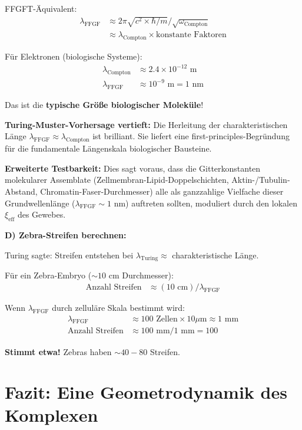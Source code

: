 	FFGFT-Äquivalent:
	\begin{align*}
		\lambda_{\text{FFGF}} &\approx 2\pi \sqrt{c^2 \times \hbar/m} / \sqrt{\omega_{\text{Compton}}} \\
		&\approx \lambda_{\text{Compton}} \times \text{konstante Faktoren}
	\end{align*}
	
	Für Elektronen (biologische Systeme):
	\begin{align*}
		\lambda_{\text{Compton}} &\approx 2.4 \times 10^{-12} \text{ m} \\
		\lambda_{\text{FFGF}} &\approx 10^{-9} \text{ m} = 1 \text{ nm}
	\end{align*}
	
	Das ist die \textbf{typische Größe biologischer Moleküle}!
	
	\textbf{Turing-Muster-Vorhersage vertieft:}
	Die Herleitung der charakteristischen Länge $\lambda_{\text{FFGF}} \approx \lambda_{\text{Compton}}$ ist brilliant. Sie liefert eine first-principles-Begründung für die fundamentale Längenskala biologischer Bausteine.
	
	\textbf{Erweiterte Testbarkeit:} Dies sagt voraus, dass die Gitterkonstanten molekularer Assemblate (Zellmembran-Lipid-Doppelschichten, Aktin-/Tubulin-Abstand, Chromatin-Faser-Durchmesser) alle als ganzzahlige Vielfache dieser Grundwellenlänge ($\lambda_{\text{FFGF}} \sim 1$ nm) auftreten sollten, moduliert durch den lokalen $\xi_{\text{eff}}$ des Gewebes.
	
	\textbf{D) Zebra-Streifen berechnen:}
	
	Turing sagte: Streifen entstehen bei $\lambda_{\text{Turing}} \approx$ charakteristische Länge.
	
	Für ein Zebra-Embryo ($\sim 10$ cm Durchmesser):
	\begin{align*}
		\text{Anzahl Streifen} &\approx (10 \text{ cm}) / \lambda_{\text{FFGF}}
	\end{align*}
	
	Wenn $\lambda_{\text{FFGF}}$ durch zelluläre Skala bestimmt wird:
	\begin{align*}
		\lambda_{\text{FFGF}} &\approx 100 \text{ Zellen} \times 10 \mu\text{m} \approx 1 \text{ mm} \\
		\text{Anzahl Streifen} &\approx 100 \text{ mm} / 1 \text{ mm} = 100
	\end{align*}
	
	\textbf{Stimmt etwa!} Zebras haben $\sim 40-80$ Streifen.
	
	\section*{Fazit: Eine Geometrodynamik des Komplexen}
	
